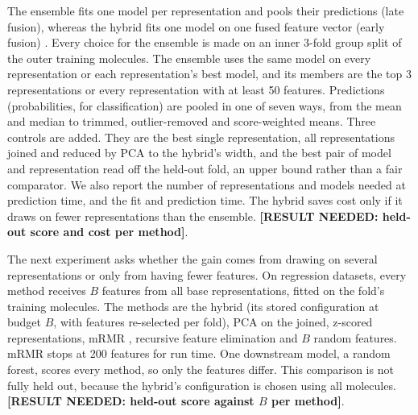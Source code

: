 
The ensemble fits one model per representation and pools their predictions (late fusion), whereas the hybrid fits one model on one fused feature vector (early fusion) \citep{Stahlschmidt2022}. Every choice for the ensemble is made on an inner 3-fold group split of the outer training molecules. The ensemble uses the same model on every representation or each representation's best model, and its members are the top 3 representations or every representation with at least 50 features. Predictions (probabilities, for classification) are pooled in one of seven ways, from the mean and median to trimmed, outlier-removed and score-weighted means. Three controls are added. They are the best single representation, all representations joined and reduced by PCA to the hybrid's width, and the best pair of model and representation read off the held-out fold, an upper bound rather than a fair comparator. We also report the number of representations and models needed at prediction time, and the fit and prediction time. The hybrid saves cost only if it draws on fewer representations than the ensemble. \textbf{[RESULT NEEDED: held-out score and cost per method]}.

The next experiment asks whether the gain comes from drawing on several representations or only from having fewer features. On regression datasets, every method receives $B$ features from all base representations, fitted on the fold's training molecules. The methods are the hybrid (its stored configuration at budget $B$, with features re-selected per fold), PCA on the joined, z-scored representations, mRMR \citep{Peng2005}, recursive feature elimination \citep{Guyon2002} and $B$ random features. mRMR stops at 200 features for run time. One downstream model, a random forest, scores every method, so only the features differ. This comparison is not fully held out, because the hybrid's configuration is chosen using all molecules. \textbf{[RESULT NEEDED: held-out score against $B$ per method]}.

